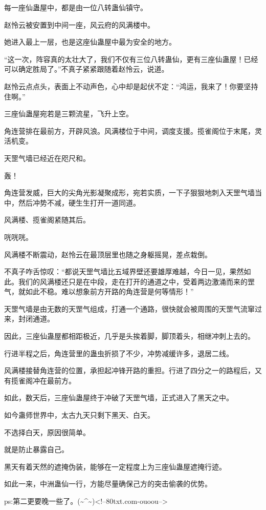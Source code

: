 \begin{this_body}
每一座仙蛊屋中，都是由一位八转蛊仙镇守。

赵怜云被安置到中间一座，风云府的风满楼中。

她进入最上一层，也是这座仙蛊屋中最为安全的地方。

“这一次，阵容真的太壮大了，我们不仅有三位八转蛊仙，更有三座仙蛊屋！已经可以确定胜局了。”不真子紧紧跟随着赵怜云，说道。

赵怜云点点头，表面上不动声色，心中却是起伏不定：“鸿运，我来了！你要坚持住啊。”

三座仙蛊屋宛若是三颗流星，飞升上空。

角连营排在最前方，开辟风浪。风满楼位于中间，调度支援。揽雀阁位于末尾，灵活机变。

天罡气墙已经近在咫尺和。

轰！

角连营发威，巨大的尖角光影凝聚成形，宛若实质，一下子狠狠地刺入天罡气墙当中，然后冲势不减，硬生生打开一道同道。

风满楼、揽雀阁紧随其后。

咣咣咣。

风满楼不断震动，赵怜云在最顶层里也随之身躯摇晃，差点栽倒。

不真子咋舌惊叹：“都说天罡气墙比五域界壁还要雄厚难越，今日一见，果然如此。我们的风满楼还只是在中段，走在打开的通道之中，受着两边激涌而来的罡气，就如此不稳。难以想象前方开路的角连营是何等情形！”

天罡气墙是由无数的天罡气组成，打通一个通路，很快就会被周围的天罡气流窜过来，封闭通道。

因此，三座仙蛊屋都相距极近，几乎是头挨着脚，脚顶着头，相继冲刺上去的。

行进半程之后，角连营里的蛊虫折损了不少，冲势减缓许多，退居二线。

风满楼接替角连营的位置，承担起冲锋开路的重担。行进了四分之一的路程后，又有揽雀阁冲在最前方。

如此，数天后，三座仙蛊屋终于冲破了天罡气墙，正式进入了黑天之中。

如今蛊师世界中，太古九天只剩下黑天、白天。

不选择白天，原因很简单。

就是防止暴露自己。

黑天有着天然的遮掩伪装，能够在一定程度上为三座仙蛊屋遮掩行迹。

如此一来，中洲蛊仙一行，方能尽量确保己方的突击偷袭的优势。

ps:第二更要晚一些了。(\~{}\^{}\~{})<!--80txt.com-ouoou-->

\end{this_body}


